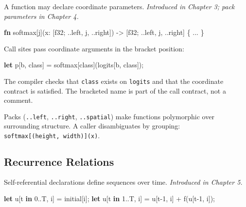 \documentclass[11pt,titlepage]{article}
\newenvironment{Shaded}{}{}
\newcommand{\DataTypeTok}[1]{\textcolor[rgb]{0.56,0.13,0.00}{#1}}
\newcommand{\DecValTok}[1]{\textcolor[rgb]{0.25,0.63,0.44}{#1}}
\newcommand{\KeywordTok}[1]{\textcolor[rgb]{0.00,0.44,0.13}{\textbf{#1}}}
\newcommand{\NormalTok}[1]{#1}
\newcommand{\OperatorTok}[1]{\textcolor[rgb]{0.40,0.40,0.40}{#1}}
\begin{document}
A function may declare coordinate parameters. \emph{Introduced in
Chapter 3; pack parameters in Chapter 4.}

\begin{Shaded}
\begin{Highlighting}[]
\KeywordTok{fn}\NormalTok{ softmax[j](x: }\OperatorTok{[}\DataTypeTok{f32}\NormalTok{; ..left, j, ..right}\OperatorTok{]}\NormalTok{)}
\NormalTok{    -> }\OperatorTok{[}\DataTypeTok{f32}\NormalTok{; ..left, j, ..right}\OperatorTok{]}
\OperatorTok{\{}\NormalTok{ ... }\OperatorTok{\}}
\end{Highlighting}
\end{Shaded}

Call sites pass coordinate arguments in the bracket position:

\begin{Shaded}
\begin{Highlighting}[]
\KeywordTok{let}\NormalTok{ p}\OperatorTok{[}\NormalTok{b, class}\OperatorTok{]}\NormalTok{ = softmax}\OperatorTok{[}\NormalTok{class}\OperatorTok{]}\NormalTok{(logits}\OperatorTok{[}\NormalTok{b, class}\OperatorTok{]}\NormalTok{);}
\end{Highlighting}
\end{Shaded}

The compiler checks that \texttt{class} exists on \texttt{logits} and
that the coordinate contract is satisfied. The bracketed name is part of
the call contract, not a comment.

Packs (\texttt{..left}, \texttt{..right}, \texttt{..spatial}) make
functions polymorphic over surrounding structure. A caller disambiguates
by grouping: \texttt{softmax{[}(height,\ width){]}(x)}.

\vspace{2em}

\hypertarget{recurrence-relations}{%
\subsection{Recurrence Relations}\label{recurrence-relations}}

Self-referential declarations define sequences over time.
\emph{Introduced in Chapter 5.}

\begin{Shaded}
\begin{Highlighting}[]
\KeywordTok{let}\NormalTok{ u}\OperatorTok{[}\NormalTok{t }\KeywordTok{in} \DecValTok{0.}\NormalTok{.T, i}\OperatorTok{]}\NormalTok{ = initial}\OperatorTok{[}\NormalTok{i}\OperatorTok{]}\NormalTok{;}
\KeywordTok{let}\NormalTok{ u}\OperatorTok{[}\NormalTok{t }\KeywordTok{in} \DecValTok{1.}\NormalTok{.T, i}\OperatorTok{]}\NormalTok{ = u}\OperatorTok{[}\NormalTok{t-}\DecValTok{1}\NormalTok{, i}\OperatorTok{]}\NormalTok{ + f(u}\OperatorTok{[}\NormalTok{t-}\DecValTok{1}\NormalTok{, i}\OperatorTok{]}\NormalTok{);}
\end{Highlighting}
\end{Shaded}
\end{document}
